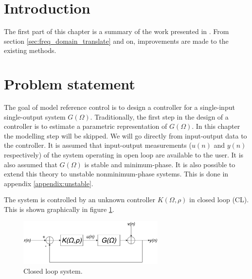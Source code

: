 \section{Introduction}
The first part of this chapter is a summary of the work presented in \cite{Data-driven_model_reference_control}. From section \ref{sec:freq_domain_translate} and on, improvements are made to the existing methods.

\section{Problem statement}
The goal of model reference control is to design a controller for a single-input single-output system $G(\Omega)$. Traditionally, the first step in the design of a controller is to estimate a parametric representation of $G(\Omega)$. In this chapter the modelling step will be skipped. We will go directly from input-output data to the controller. It is assumed that input-output measurements ($u(n)$ and $y(n)$ respectively) of the system operating in open loop are available to the user. It is also assumed that $G(\Omega)$ is stable and minimum-phase. It is also possible to extend this theory to unstable nonminimum-phase systems. This is done in appendix \ref{appendix:unstable}.

The system is controlled by an unknown controller $K(\Omega,\rho)$ in closed loop (CL). This is shown graphically in figure \ref{fig:closed_loop_system}.

\begin{figure}[H]
    \centering
    \includegraphics[width = 0.65\textwidth]{figures/closed_loop_system.pdf}
    \caption{Closed loop system.}
    \label{fig:closed_loop_system}
\end{figure}

